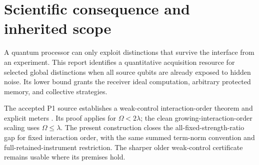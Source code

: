 \documentclass[11pt,a4paper]{article}
\newcommand{\id}{\operatorname{id}}
\newcommand{\Ad}{\operatorname{Ad}}
\newcommand{\norm}[1]{\left\lVert #1\right\rVert}
\newcommand{\Pcal}{\mathcal P}
\newcommand{\Ncal}{\mathcal N}
\begin{document}
\begin{abstract}
An initially unencoded $n$-qubit source experiences actual independent inaccessible Markov dephasing $\lambda\sum_i(\Ad_{Z_i}-\id)$ from the beginning of acquisition. All uncharged operations, including their retained records, preserve source $Z_i$ parity sectors. Paid Hamiltonian terms noncommute with at most $k$ source $Z_i$, with summed term-norm budget $\Omega(t)$ per source site. The reader may have arbitrary protected quantum memory, collective processing, and genuine measured feedback satisfying the budget in every classical branch.

A first-dephasing deadline argument gives the time-uniform acquired-channel bound $\norm{\Ncal\Pcal_R}_\diamond\le q_k^{|R|}$, where $q_k=e^{-\lambda/(k\Omega)}+(1-e^{-\lambda/(k\Omega)})2^{-1/k}<1$ for every finite $\Omega/\lambda>0$. No initial noise layer or waiting period before control is assumed. A stronger coefficient follows under a global Hamiltonian-decomposition budget.

At fixed $k$ and strong control, the optimal specimen cost of the specified global-parity and GHZ discrimination promises has exponential order $\exp[\Theta_k(n\lambda/\Omega)]$. Ordinary parallel local meters attain the upper order. Polynomial-copy acquisition therefore requires $\Omega/\lambda$ of order at least $n/\log n$. A zero-start summed slew cap $K$ additionally requires $K/\lambda^2$ of order at least $(n/\log n)^2$. Finite triangular or trapezoidal pulses attain both scales. A worst-case constant-gap purity lower bound follows, without asserting a matching universal purity algorithm.
\end{abstract}
\tableofcontents
\newpage

\section{Scientific consequence and inherited scope}

A quantum processor can only exploit distinctions that survive the interface from an experiment. This report identifies a quantitative acquisition resource for selected global distinctions when all source qubits are already exposed to hidden noise. Its lower bound grants the receiver ideal computation, arbitrary protected memory, and collective strategies.

The accepted P1 source establishes a weak-control interaction-order theorem and explicit meters \cite{astra}. Its proof applies for $\Omega<2\lambda$; the clean growing-interaction-order scaling uses $\Omega\le\lambda$. The present construction closes the all-fixed-strength-ratio gap for fixed interaction order, with the same summed term-norm convention and full-retained-instrument restriction. The sharper older weak-control certificate remains usable where its premises hold.
\end{document}
